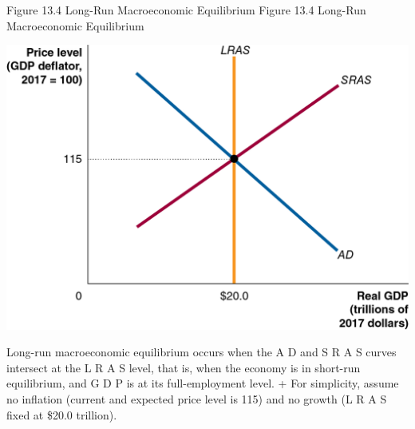 \documentclass[
  12pt,
  ignorenonframetext,
]{beamer}
\begin{document}
\begin{frame}{Figure 13.4 Long-Run Macroeconomic Equilibrium}
\protect\hypertarget{figure-13.4-long-run-macroeconomic-equilibrium}{}
Figure 13.4 Long-Run Macroeconomic Equilibrium

\includegraphics[width=\textwidth,height=0.99\textheight]{imgs3/img_slide31a.png}

Long-run macroeconomic equilibrium occurs when the A D and S R A S
curves intersect at the L R A S level, that is, when the economy is in
short-run equilibrium, and G D P is at its full-employment level. + For
simplicity, assume no inflation (current and expected price level is
115) and no growth (L R A S fixed at \$20.0 trillion).
\end{frame}
\end{document}
